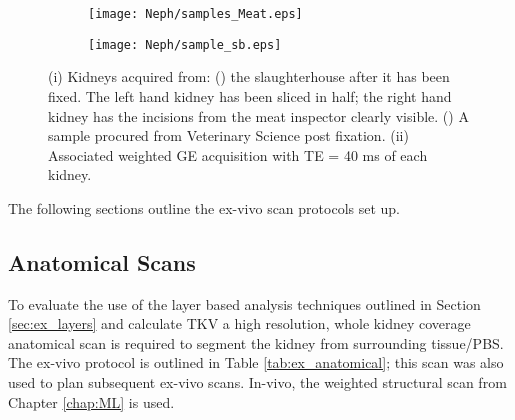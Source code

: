 \begin{figure}[H]
	\centering
	\begin{subfigure}[c]{0.47\textwidth}
		\centering
		\texttt{[image: Neph/samples\_Meat.eps]}
		\caption{}
		\label{fig:ex_samples_meat}
	\end{subfigure}
	\hfill
	\begin{subfigure}[c]{0.47\textwidth}
		\centering
		\texttt{[image: Neph/sample\_sb.eps]}
		\caption{}
		\label{fig:ex_samples_sb}
	\end{subfigure}
	\caption{(i) Kidneys acquired from: () the slaughterhouse after it has been fixed. The left hand kidney has been sliced in half; the right hand kidney has the incisions from the meat inspector clearly visible. () A sample procured from Veterinary Science post fixation. (ii) Associated \ttwo weighted \ac*{GE} acquisition with TE = 40 ms of each kidney.}
	\label{fig:ex_samples}
\end{figure}
The following sections outline the ex-vivo scan protocols set up.
\subsection{Anatomical Scans}
\label{subsec:ex_anatomical_scans}
To evaluate the use of the layer based analysis techniques outlined in Section \ref{sec:ex_layers} and calculate \ac{TKV} a high resolution, whole kidney coverage anatomical scan is required to segment the kidney from surrounding tissue/\ac{PBS}. The ex-vivo protocol is outlined in Table \ref{tab:ex_anatomical}; this scan was also used to plan subsequent ex-vivo scans. In-vivo, the \ttwo weighted structural scan from Chapter \ref{chap:ML} is used.


